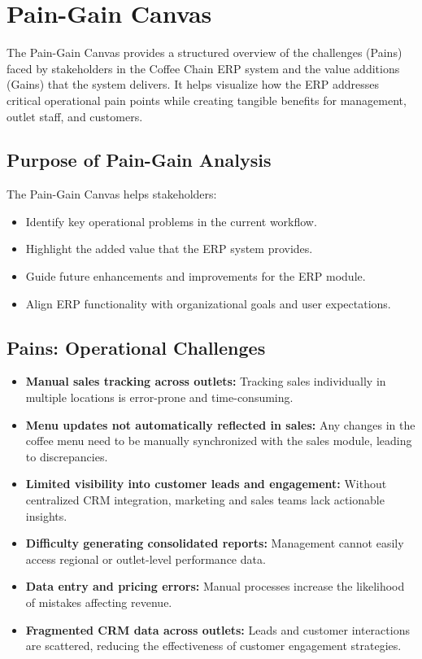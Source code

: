 \chapter{Pain-Gain Canvas}

The Pain-Gain Canvas provides a structured overview of the challenges (Pains) faced by stakeholders in the Coffee Chain ERP system and the value additions (Gains) that the system delivers. It helps visualize how the ERP addresses critical operational pain points while creating tangible benefits for management, outlet staff, and customers.

\section*{Purpose of Pain-Gain Analysis}
The Pain-Gain Canvas helps stakeholders:
\begin{itemize}
    \item Identify key operational problems in the current workflow.
    \item Highlight the added value that the ERP system provides.
    \item Guide future enhancements and improvements for the ERP module.
    \item Align ERP functionality with organizational goals and user expectations.
\end{itemize}

\section*{Pains: Operational Challenges}

\begin{itemize}
    \item \textbf{Manual sales tracking across outlets:} Tracking sales individually in multiple locations is error-prone and time-consuming.
    \item \textbf{Menu updates not automatically reflected in sales:} Any changes in the coffee menu need to be manually synchronized with the sales module, leading to discrepancies.
    \item \textbf{Limited visibility into customer leads and engagement:} Without centralized CRM integration, marketing and sales teams lack actionable insights.
    \item \textbf{Difficulty generating consolidated reports:} Management cannot easily access regional or outlet-level performance data.
    \item \textbf{Data entry and pricing errors:} Manual processes increase the likelihood of mistakes affecting revenue.
    \item \textbf{Fragmented CRM data across outlets:} Leads and customer interactions are scattered, reducing the effectiveness of customer engagement strategies.
\end{itemize}

